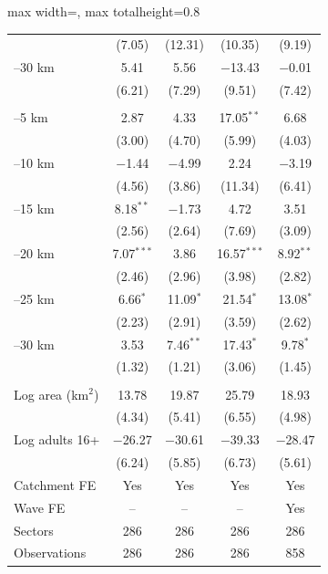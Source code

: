 \documentclass[11pt]{article}
\begin{document}
\begin{table}[H]
\begin{adjustbox}{max width=\textwidth, max totalheight=0.8\textheight}
\begin{tabular}{lcccc}
 & (7.05) & (12.31) & (10.35) & (9.19) \\
\quad 25--30 km & 5.41 & 5.56 & $-$13.43 & $-$0.01 \\
 & (6.21) & (7.29) & (9.51) & (7.42) \\
\addlinespace
\multicolumn{5}{l}{\textit{Catchment: Volcanoes}} \\
\quad 0--5 km & 2.87 & 4.33 & 17.05$^{**}$ & 6.68 \\
 & (3.00) & (4.70) & (5.99) & (4.03) \\
\quad 5--10 km & $-$1.44 & $-$4.99 & 2.24 & $-$3.19 \\
 & (4.56) & (3.86) & (11.34) & (6.41) \\
\quad 10--15 km & 8.18$^{**}$ & $-$1.73 & 4.72 & 3.51 \\
 & (2.56) & (2.64) & (7.69) & (3.09) \\
\quad 15--20 km & 7.07$^{***}$ & 3.86 & 16.57$^{***}$ & 8.92$^{**}$ \\
 & (2.46) & (2.96) & (3.98) & (2.82) \\
\quad 20--25 km & 6.66$^{*}$ & 11.09$^{*}$ & 21.54$^{*}$ & 13.08$^{*}$ \\
 & (2.23) & (2.91) & (3.59) & (2.62) \\
\quad 25--30 km & 3.53 & 7.46$^{**}$ & 17.43$^{*}$ & 9.78$^{*}$ \\
 & (1.32) & (1.21) & (3.06) & (1.45) \\
\addlinespace
\multicolumn{5}{l}{\textit{Controls}} \\
\quad Log area (km$^2$) & 13.78 & 19.87 & 25.79 & 18.93 \\
 & (4.34) & (5.41) & (6.55) & (4.98) \\
\quad Log adults 16+ & $-$26.27 & $-$30.61 & $-$39.33 & $-$28.47 \\
 & (6.24) & (5.85) & (6.73) & (5.61) \\
\midrule
Catchment FE & Yes & Yes & Yes & Yes \\
Wave FE & -- & -- & -- & Yes \\
Sectors & 286 & 286 & 286 & 286 \\
Observations & 286 & 286 & 286 & 858 \\
\bottomrule
\end{tabular}
\end{adjustbox}
\begin{minipage}{0.97\textwidth}\scriptsize

\end{minipage}
\end{table}
\end{document}
